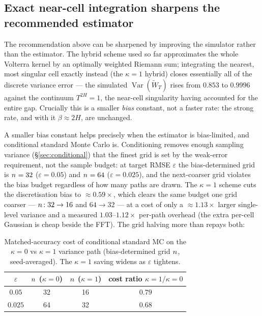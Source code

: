 \documentclass[11pt]{article}
\begin{document}
\subsection{Exact near-cell integration sharpens the recommended estimator}
\label{sec:kappa1}

The recommendation above can be sharpened by improving the simulator rather than the
estimator. The hybrid scheme used so far approximates the whole Volterra kernel by an
optimally weighted Riemann sum; integrating the nearest, most singular cell exactly instead
(the $\kappa=1$ hybrid) closes essentially all of the discrete variance error --- the
simulated $\operatorname{Var}(\widetilde W_T)$ rises from $0.853$ to $0.9996$ against the
continuum $T^{2H}=1$, the near-cell singularity having accounted for the entire gap.
Crucially this is a smaller \emph{bias} constant, not a faster rate: the strong rate, and
with it $\beta\approx2H$, are unchanged.

A smaller bias constant helps precisely when the estimator is bias-limited, and conditional
standard Monte Carlo is. Conditioning removes enough sampling variance (\S\ref{sec:conditional})
that the finest grid is set by the weak-error requirement, not the sample budget: at target
RMSE $\varepsilon$ the bias-determined grid is $n^{\*}=32$ ($\varepsilon=0.05$) and
$n^{\*}=64$ ($\varepsilon=0.025$), and the next-coarser grid violates the bias budget
regardless of how many paths are drawn. The $\kappa=1$ scheme cuts the discretisation bias to
$\approx0.59\times$, which clears the same budget one grid coarser --- $n^{\*}\!:32\to16$ and
$64\to32$ --- at a cost of only a $\approx1.13\times$ larger single-level variance and a
measured $1.03$--$1.12\times$ per-path overhead (the extra per-cell Gaussian is cheap beside
the FFT). The grid halving more than repays both:

\begin{table}[h]
\centering
\caption{Matched-accuracy cost of conditional standard MC on the $\kappa=0$ vs $\kappa=1$
variance path (bias-determined grid $n^{\*}$, seed-averaged). The $\kappa=1$ saving widens as
$\varepsilon$ tightens.}
\label{tab:kappa1cost}
\begin{tabular}{cccc}
\toprule
$\varepsilon$ & $n^{\*}$ ($\kappa{=}0$) & $n^{\*}$ ($\kappa{=}1$) & cost ratio $\kappa{=}1/\kappa{=}0$ \\
\midrule
$0.05$  & 32 & 16 & $0.79$ \\
$0.025$ & 64 & 32 & $0.68$ \\
\bottomrule
\end{tabular}
\end{table}
\end{document}
